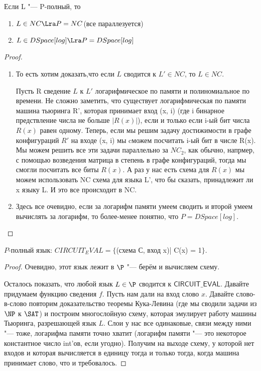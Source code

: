 \begin{theorem}
	Если L "--- P-полный, то 
	\begin{enumerate}
		\item  $L \in NC \Lra P = NC$(все параллезуется)
		\item  $L \in DSpace[log] \Lra P = DSpace[log]$
    \end{enumerate}
\end{theorem}
\begin{proof}
	\begin{enumerate}
	\item 
	То есть хотим доказать,что если $L$ сводится к $L' \in NC$, то $L \in NC$.

	Пусть R сведение $L$ к $L'$ логарифмическое по памяти и полиномиальное по времени. 
	Не сложно заметить, что существует логарифмическая по памяти 
	машина тьюринга R', которая принимает вход (x, i) (где i бинарное предствление числа не больше $|R(x)|$), если
	и только если i-ый бит числа $R(x)$ равен одному. Теперь, если мы решим задачу достижимости в графе 
	конфигураций $R'$ на входе (x, i) мы cможем посчитать i-ый бит в числе R(x). Мы можем решить 
	все эти задачи параллельно за $NC_2$, как обычно, напрмер, 
	с помощью возведения матрица в степень в графе конфигураций, 
	тогда мы смогли посчитать все биты $R(x)$. А раз у нас есть схема для $R(x)$ 
	мы можем использовать NC схема для языка L', что бы сказать, 
	принадлежит ли x языку L. И это все происходит в NC.
 
	\item Здесь все очевидно, если за логарифм памяти умеем сводить и второй умеем вычислять за логарифм, то более-менее понятно, 
	что $P = DSpace[log]$.
\end{enumerate}
\end{proof}

\begin{theorem}
	$P$-полный язык: $CIRCUIT_EVAL = \{$(схема С, вход x)| C(x) = 1$\}$. \\
\end{theorem}
\begin{proof}
	Очевидно, этот язык лежит в $\P$ "--- берём и вычисляем схему.

	Осталось показать, что любой язык $L \in \P$ сводится к $\mathsf{CIRCUIT\_EVAL}$.
	Давайте придумаем функцию сведения $f$. Пусть нам дали на вход слово $x$.
	Давайте слово-в-слово повторим доказательство теоремы Кука-Левина (где мы сводили задачи из $\NP$ к $\SAT$) и построим
	многослойную схему, которая эмулирует работу машины Тьюринга, разрешающей язык $L$.
	Слои у нас все одинаковые, связи между ними "--- тоже, логарифма памяти точно хватит (логарифм памяти "--- это некоторое константное число int'ов, если угодно).
	Получим на выходе схему, у которой нет входов 
	и которая вычисляется в единицу тогда и только тогда, когда машина принимает слово, что и требовалось.
	\end{proof}

